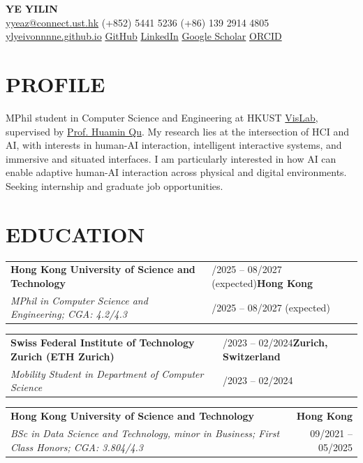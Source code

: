 \documentclass[9pt,a4paper]{extarticle}
\makeatletter
\newcommand{\cventry}[5]{%
  \begin{tabularx}{\textwidth}{@{}X>{\raggedleft\arraybackslash}p{5.0cm}@{}}
    \textbf{#1} & \if\relax\detokenize{#2}\relax #4\else\textbf{#2}\fi \\
    \textit{#3} & \if\relax\detokenize{#2}\relax\else #4\fi
  \end{tabularx}
  #5\par\vspace{0.8pt}
}
\makeatother
\begin{document}
\pagestyle{empty}
\fontsize{9.5}{10.5}\selectfont

\begin{center}
  {\fontsize{19}{21}\selectfont\bfseries YE YILIN}\\[4pt]
  \href{mailto:yyeaz@connect.ust.hk}{yyeaz@connect.ust.hk}
  \enspace\textbar\enspace (+852) 5441 5236
  \enspace\textbar\enspace (+86) 139 2914 4805\\[2pt]
  \href{https://ylyeivonnnne.github.io}{ylyeivonnnne.github.io}
  \enspace\textbar\enspace
  \href{https://github.com/ylyeivonnnne}{GitHub}
  \enspace\textbar\enspace
  \href{https://www.linkedin.com/in/yilin-ye-811ab0252/}{LinkedIn}
  \enspace\textbar\enspace
  \href{https://scholar.google.com/citations?hl=en&user=fhwz3soAAAAJ}{Google Scholar}
  \enspace\textbar\enspace
  \href{https://orcid.org/0009-0000-9986-4420}{ORCID}
\end{center}
\vspace{-5pt}

\section{PROFILE}

MPhil student in Computer Science and Engineering at HKUST \href{http://vis.cse.ust.hk/index.html}{VisLab}, supervised by \href{http://huamin.org}{Prof. Huamin Qu}. My research lies at the intersection of HCI and AI, with interests in human-AI interaction, intelligent interactive systems, and immersive and situated interfaces. I am particularly interested in how AI can enable adaptive human-AI interaction across physical and digital environments. Seeking internship and graduate job opportunities.

\section{EDUCATION}

\cventry{Hong Kong University of Science and Technology}{Hong Kong}{MPhil in Computer Science and Engineering; CGA: 4.2/4.3}{09/2025 -- 08/2027 (expected)}{}

\cventry{Swiss Federal Institute of Technology Zurich (ETH Zurich)}{Zurich, Switzerland}{Mobility Student in Department of Computer Science}{09/2023 -- 02/2024}{}

\begin{tabularx}{\textwidth}{@{}Xr@{}}
\textbf{Hong Kong University of Science and Technology} & \textbf{Hong Kong} \\
\textit{BSc in Data Science and Technology, minor in Business; First Class Honors; CGA: 3.804/4.3} & 09/2021 -- 05/2025
\end{tabularx}\par\vspace{0.8pt}
\end{document}
